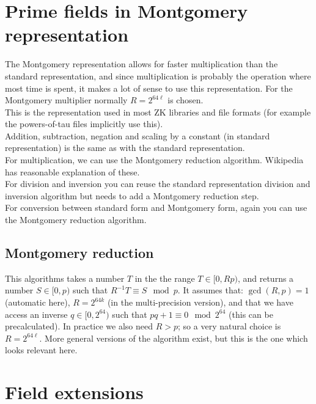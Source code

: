 \documentclass[12pt,draft,a4paper,openany,oneside]{amsbook}
\theoremstyle{plain}
\theoremstyle{definition}
\begin{document}
\section{Prime fields in Montgomery representation}

The Montgomery representation allows for faster multiplication than the standard
representation, and since multiplication is probably the operation where most
time is spent, it makes a lot of sense to use this representation. For the 
Montgomery multiplier normally $R=2^{64\ell}$ is chosen.\\

This is the representation used in most ZK libraries and file formats (for example
the powers-of-tau files implicitly use this).\\

Addition, subtraction, negation and scaling by a constant (in standard representation) 
is the same as with the standard representation.\\

For multiplication, we can use the Montgomery reduction algorithm. Wikipedia
has reasonable explanation of these.\\

For division and inversion you can reuse the standard representation division and inversion
algorithm but needs to add a Montgomery reduction step.\\

For conversion between standard form and Montgomery form, again you can use
the Montgomery reduction algorithm.\\

\subsection{Montgomery reduction}
This algorithms takes a number $T$ in the the range $T\in[0,Rp)$, and returns
a number $S\in[0,p)$ such that $R^{-1}T\equiv S \mod p$. It assumes that:
$\gcd(R,p)=1$ (automatic here), $R=2^{64k}$ (in the multi-precision version), and that we have access
an inverse $q\in[0,2^{64})$ such that $pq + 1 \equiv 0\mod 2^{64}$ (this can be precalculated).
In practice we also need $R>p$; so a very natural choice is $R=2^{64\ell}$.
More general versions of the algorithm exist, but this is the one which looks
relevant here.


\section{Field extensions}
\end{document}

